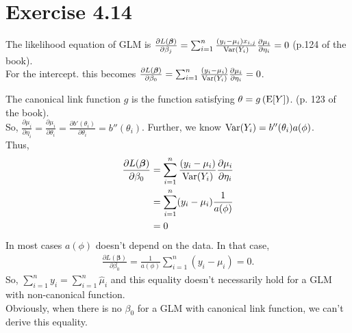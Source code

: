 \section*{Exercise 4.14}
The likelihood equation of GLM is $\frac{\partial L(\bm{\beta})}{\partial \beta_{j}} = \sum_{i=1}^{n}\frac{(y_{i}-\mu_{i})x_{i,j}}{\mathrm{Var}(Y_{i})}\frac{\partial \mu_{i}}{\partial \eta_{i}} = 0$ (p.124 of the book).\\
For the intercept. this becomes 
$\frac{\partial L(\bm{\beta})}{\partial \beta_{0}} = \sum_{i=1}^{n}\frac{(y_{i}-\mu_{i})}{\mathrm{Var}(Y_{i})}\frac{\partial \mu_{i}}{\partial \eta_{i}} = 0$.

The canonical link function $g$ is the function satisfying $\theta = g\left(\mathrm{E}[Y] \right)$. (p. 123 of the book).\\
So, $\frac{\partial \mu_{i}}{\partial \eta_{i}} = \frac{\partial \mu_{i}}{\partial \theta_{i}} = \frac{\partial b'(\theta_{i})}{\partial \theta_{i}} = b''(\theta_{i})$. Further, we know $\mathrm{Var}(Y_{i}) = b''(\theta_{i})a(\phi)$.\\
Thus,
\begin{align*}
\frac{\partial L(\bm{\beta})}{\partial \beta_{0}} &= \sum_{i=1}^{n}\frac{(y_{i}-\mu_{i})}{\mathrm{Var}(Y_{i})}\frac{\partial \mu_{i}}{\partial \eta_{i}}\\
&= \sum_{i=1}^{n}(y_{i}-\mu_{i})\frac{1}{a(\phi)}\\
&= 0
\end{align*}
In most cases $a(\phi)$ doesn't depend on the data. In that case, 
\begin{align*}
\frac{\partial L(\bm{\beta})}{\partial \beta_{0}} = \frac{1}{a(\phi)}\sum_{i=1}^{n}(y_{i}-\mu_{i}) = 0.
\end{align*}
So, $\sum_{i=1}^{n}y_{i} = \sum_{i=1}^{n}\widehat{\mu}_{i}$ and this equality doesn't necessarily hold for a GLM with non-canonical function.\\
Obviously, when there is no $\beta_{0}$ for a GLM with canonical link function, we can't derive this equality.